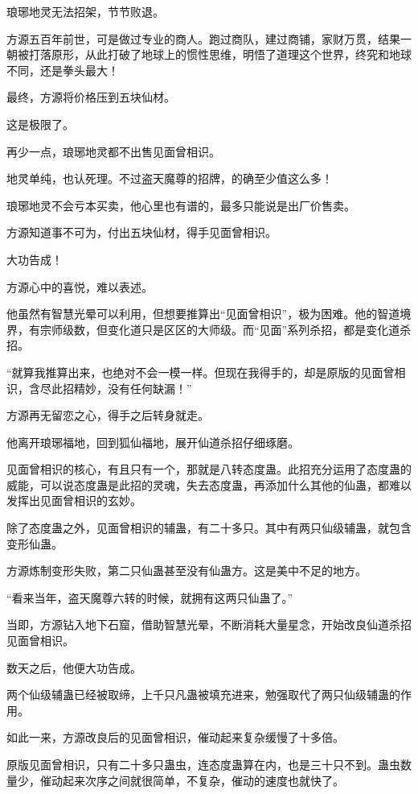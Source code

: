 \begin{this_body}
琅琊地灵无法招架，节节败退。

方源五百年前世，可是做过专业的商人。跑过商队，建过商铺，家财万贯，结果一朝被打落原形，从此打破了地球上的惯性思维，明悟了道理这个世界，终究和地球不同，还是拳头最大！

最终，方源将价格压到五块仙材。

这是极限了。

再少一点，琅琊地灵都不出售见面曾相识。

地灵单纯，也认死理。不过盗天魔尊的招牌，的确至少值这么多！

琅琊地灵不会亏本买卖，他心里也有谱的，最多只能说是出厂价售卖。

方源知道事不可为，付出五块仙材，得手见面曾相识。

大功告成！

方源心中的喜悦，难以表述。

他虽然有智慧光晕可以利用，但想要推算出“见面曾相识”，极为困难。他的智道境界，有宗师级数，但变化道只是区区的大师级。而“见面”系列杀招，都是变化道杀招。

“就算我推算出来，也绝对不会一模一样。但现在我得手的，却是原版的见面曾相识，含尽此招精妙，没有任何缺漏！”

方源再无留恋之心，得手之后转身就走。

他离开琅琊福地，回到狐仙福地，展开仙道杀招仔细琢磨。

见面曾相识的核心，有且只有一个，那就是八转态度蛊。此招充分运用了态度蛊的威能，可以说态度蛊是此招的灵魂，失去态度蛊，再添加什么其他的仙蛊，都难以发挥出见面曾相识的玄妙。

除了态度蛊之外，见面曾相识的辅蛊，有二十多只。其中有两只仙级辅蛊，就包含变形仙蛊。

方源炼制变形失败，第二只仙蛊甚至没有仙蛊方。这是美中不足的地方。

“看来当年，盗天魔尊六转的时候，就拥有这两只仙蛊了。”

当即，方源钻入地下石窟，借助智慧光晕，不断消耗大量星念，开始改良仙道杀招见面曾相识。

数天之后，他便大功告成。

两个仙级辅蛊已经被取缔，上千只凡蛊被填充进来，勉强取代了两只仙级辅蛊的作用。

如此一来，方源改良后的见面曾相识，催动起来复杂缓慢了十多倍。

原版见面曾相识，只有二十多只蛊虫，连态度蛊算在内，也是三十只不到。蛊虫数量少，催动起来次序之间就很简单，不复杂，催动的速度也就快了。


\end{this_body}
